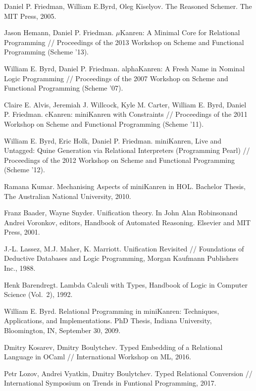 \documentclass{llncs}
\begin{document}
\begin{thebibliography}{99}
Daniel P. Friedman, William E.Byrd, Oleg Kiselyov. The Reasoned Schemer. The MIT
Press, 2005.

Jason Hemann, Daniel P. Friedman. $\mu$Kanren: A Minimal Core for Relational Programming //
Proceedings of the 2013 Workshop on Scheme and Functional Programming (Scheme '13).

William E. Byrd, Daniel P. Friedman. alphaKanren: A Fresh Name in Nominal Logic Programming //
Proceedings of the 2007 Workshop on Scheme and Functional Programming (Scheme '07).

Claire E. Alvis, Jeremiah J. Willcock, Kyle M. Carter, William E. Byrd, Daniel P. Friedman.
cKanren: miniKanren with Constraints //
Proceedings of the 2011 Workshop on Scheme and Functional Programming (Scheme '11).

William E. Byrd, Eric Holk, Daniel P. Friedman.
miniKanren, Live and Untagged: Quine Generation via Relational Interpreters (Programming Pearl) //
Proceedings of the 2012 Workshop on Scheme and Functional Programming (Scheme '12).

Ramana Kumar. Mechanising Aspects of miniKanren in HOL. Bachelor Thesis, The Australian National University, 2010.

Franz Baader, Wayne Snyder. Uniﬁcation theory. In John Alan Robinsonand Andrei Voronkov, editors,
Handbook of Automated Reasoning. Elsevier and MIT Press, 2001.

J.-L. Lassez, M.J. Maher, K. Marriott. Unification Revisited // Foundations of Deductive Databases and Logic Programming, 
Morgan Kaufmann Publishers Inc., 1988.

Henk Barendregt. Lambda Calculi with Types, Handbook of Logic in Computer Science (Vol.~2), 1992.

William E. Byrd. Relational Programming in miniKanren: Techniques, Applications, and Implementations. PhD Thesis,
Indiana University, Bloomington, IN, September 30, 2009.

Dmitry Kosarev, Dmitry Boulytchev. Typed Embedding of a Relational Language in OCaml // International Workshop on ML, 2016.

Petr Lozov, Andrei Vyatkin, Dmitry Boulytchev. Typed Relational Conversion // International Symposium on Trends in Funtional
Programming, 2017.


\end{thebibliography}
\end{document}
